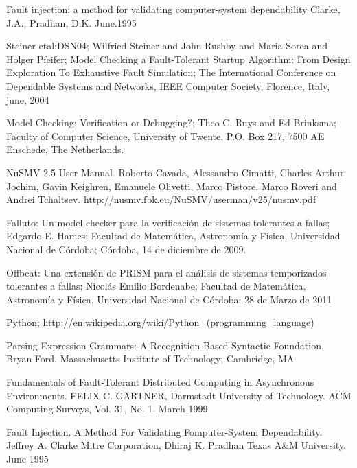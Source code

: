 \documentclass[titlepage, 12pt]{book}
\begin{document}
\newpage %

\begin{thebibliography}{99}

 Fault injection: a method for validating computer-system dependability
Clarke, J.A.; Pradhan, D.K. June.1995 

 Steiner-etal:DSN04; Wilfried Steiner and John Rushby and Maria Sorea and Holger Pfeifer; Model Checking a Fault-Tolerant Startup Algorithm: From Design Exploration To Exhaustive Fault Simulation; The International Conference on Dependable Systems and Networks, IEEE Computer Society, Florence, Italy, june, 2004

 Model Checking: Verification or Debugging?; Theo C. Ruys and Ed Brinksma; Faculty of Computer Science, University of Twente. P.O. Box 217, 7500 AE Enschede, The Netherlands.

 NuSMV 2.5 User Manual. Roberto Cavada, Alessandro Cimatti, Charles Arthur Jochim, Gavin Keighren,
Emanuele Olivetti, Marco Pistore, Marco Roveri and Andrei Tchaltsev. http://nusmv.fbk.eu/NuSMV/userman/v25/nusmv.pdf

 Falluto: Un model checker para la verificaci\'on de sistemas tolerantes a fallas; Edgardo E. Hames; Facultad de Matem\'atica, Astronom\'ia y F\'isica, Universidad Nacional de C\'ordoba; C\'ordoba, 14 de diciembre de 2009.

 Offbeat: Una extensi\'on de PRISM para el an\'alisis de sistemas temporizados tolerantes a fallas; Nicol\'as Emilio Bordenabe; Facultad de Matem\'atica, Astronom\'ia y F\'isica, Universidad Nacional de C\'ordoba; 28 de Marzo de 2011

 Python; http://en.wikipedia.org/wiki/Python\_(programming\_language)

 Parsing Expression Grammars: A Recognition-Based Syntactic Foundation. Bryan Ford. Massachusetts Institute of Technology; Cambridge, MA

 Fundamentals of Fault-Tolerant Distributed Computing in Asynchronous Environments. FELIX C. GÄRTNER,
Darmstadt University of Technology. ACM Computing Surveys, Vol. 31, No. 1, March 1999

 Fault Injection. A Method For Validating Fomputer-System Dependability. Jeffrey A. Clarke Mitre Corporation, Dhiraj K. Pradhan Texas A\&M University. June 1995


\end{thebibliography}
\end{document}
